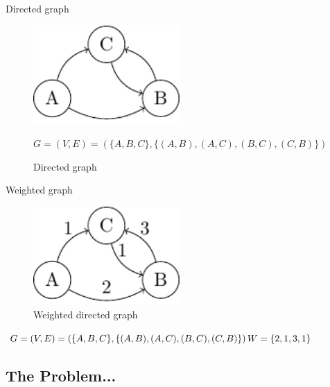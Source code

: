 \documentclass[11pt]{beamer}
\begin{document}
\begin{frame}{Directed graph}

\begin{figure}[h]
	\centering
	\includegraphics[width=0.5\textwidth]{./content/figures/directed_graph.pdf}
	\caption{Directed graph}

	\begin{math}
		G = (V, E) = \left( \{A, B, C\}, \{(A, B), (A, C), (B, C), (C, B)\} \right)
	\end{math}
\end{figure}

\end{frame}
\begin{frame}{Weighted graph}
	\begin{figure}
\end{figure}
\begin{figure}
	\centering
	\includegraphics[width=0.5\textwidth]{./content/figures/weighted_graph.pdf}
	\caption{Weighted directed graph}
\end{figure}

\begin{math}
	G = (V, E) = \left( \{A, B, C\}, \{(A, B), (A, C), (B, C), (C, B)\} \right)
	\newline
	W = \{2, 1, 3, 1\}
\end{math}
\end{frame}

\subsection{The Problem...}
\end{document}
